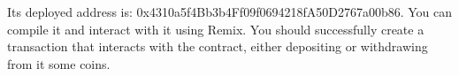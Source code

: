 \documentclass[12pt,addpoints,answers]{exam}
\begin{document}
\begin{questions}
{} %

 Its deployed address is: 0x4310a5f4Bb3b4Ff09f0694218fA50D2767a00b86. You can compile it and interact with it using Remix. You should successfully create a transaction that interacts with the contract, either depositing or withdrawing from it some coins. 
 

\newpage

~\\

\end{questions}
\end{document}
